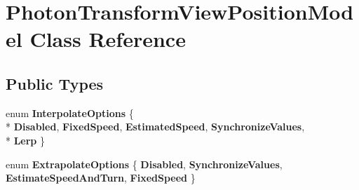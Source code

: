 \hypertarget{class_photon_transform_view_position_model}{}\section{Photon\+Transform\+View\+Position\+Model Class Reference}
\label{class_photon_transform_view_position_model}
\subsection*{Public Types}
\begin{DoxyCompactItemize}
\item 
enum {\bfseries Interpolate\+Options} \{ \\*
{\bfseries Disabled}, 
{\bfseries Fixed\+Speed}, 
{\bfseries Estimated\+Speed}, 
{\bfseries Synchronize\+Values}, 
\\*
{\bfseries Lerp}
 \}\hypertarget{class_photon_transform_view_position_model_a36efab5955c4f805aa7ce703fc363063}{}\label{class_photon_transform_view_position_model_a36efab5955c4f805aa7ce703fc363063}

\item 
enum {\bfseries Extrapolate\+Options} \{ {\bfseries Disabled}, 
{\bfseries Synchronize\+Values}, 
{\bfseries Estimate\+Speed\+And\+Turn}, 
{\bfseries Fixed\+Speed}
 \}\hypertarget{class_photon_transform_view_position_model_a81cc14379a959c4fc0e6b144360adb06}{}\label{class_photon_transform_view_position_model_a81cc14379a959c4fc0e6b144360adb06}

\end{DoxyCompactItemize}
